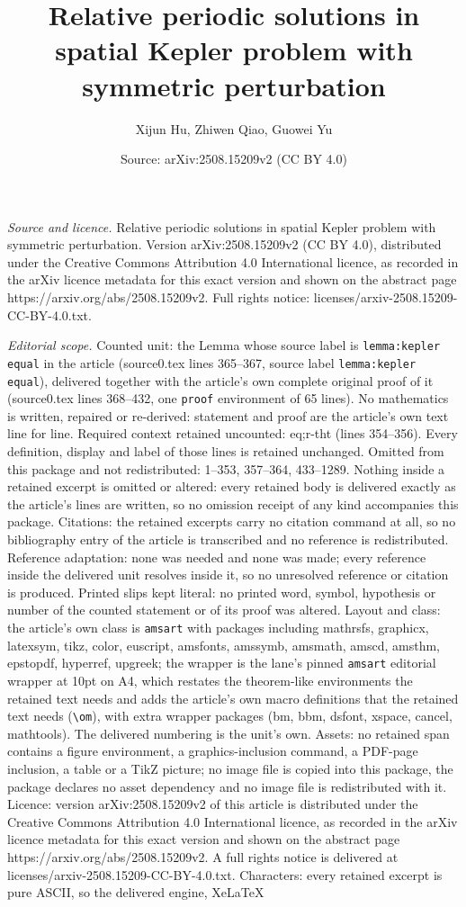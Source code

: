 \documentclass[10pt,a4paper]{amsart}
\title[Relative periodic solutions in spatial Kepler problem with s]{Relative periodic solutions in spatial Kepler problem with symmetric perturbation}
\author{Xijun Hu, Zhiwen Qiao, Guowei Yu}
\date{Source: arXiv:2508.15209v2 (CC BY 4.0)}
\begin{document}
\maketitle

\noindent\emph{Source and licence.} Relative periodic solutions in spatial Kepler problem with symmetric perturbation. Version arXiv:2508.15209v2 (CC BY 4.0), distributed under the Creative Commons Attribution 4.0 International licence, as recorded in the arXiv licence metadata for this exact version and shown on the abstract page https://arxiv.org/abs/2508.15209v2. Full rights notice: licenses/arxiv-2508.15209-CC-BY-4.0.txt.\par\smallskip

\noindent\textit{Editorial scope.} Counted unit: the Lemma whose source label is \texttt{lemma:kepler equal} in the article (source0.tex lines 365--367, source label \texttt{lemma:kepler equal}), delivered together with the article's own complete original proof of it (source0.tex lines 368--432, one \texttt{proof} environment of 65 lines). No mathematics is written, repaired or re-derived: statement and proof are the article's own text line for line. Required context retained uncounted: eq;r-tht (lines 354--356). Every definition, display and label of those lines is retained unchanged. Omitted from this package and not redistributed: 1--353, 357--364, 433--1289. Nothing inside a retained excerpt is omitted or altered: every retained body is delivered exactly as the article's lines are written, so no omission receipt of any kind accompanies this package. Citations: the retained excerpts carry no citation command at all, so no bibliography entry of the article is transcribed and no reference is redistributed. Reference adaptation: none was needed and none was made; every reference inside the delivered unit resolves inside it, so no unresolved reference or citation is produced. Printed slips kept literal: no printed word, symbol, hypothesis or number of the counted statement or of its proof was altered. Layout and class: the article's own class is \texttt{amsart} with packages including mathrsfs, graphicx, latexsym, tikz, color, euscript, amsfonts, amssymb, amsmath, amscd, amsthm, epstopdf, hyperref, upgreek; the wrapper is the lane's pinned \texttt{amsart} editorial wrapper at 10pt on A4, which restates the theorem-like environments the retained text needs and adds the article's own macro definitions that the retained text needs (\texttt{\textbackslash om}), with extra wrapper packages (bm, bbm, dsfont, xspace, cancel, mathtools). The delivered numbering is the unit's own. Assets: no retained span contains a figure environment, a graphics-inclusion command, a PDF-page inclusion, a table or a TikZ picture; no image file is copied into this package, the package declares no asset dependency and no image file is redistributed with it. Licence: version arXiv:2508.15209v2 of this article is distributed under the Creative Commons Attribution 4.0 International licence, as recorded in the arXiv licence metadata for this exact version and shown on the abstract page https://arxiv.org/abs/2508.15209v2. A full rights notice is delivered at licenses/arxiv-2508.15209-CC-BY-4.0.txt. Characters: every retained excerpt is pure ASCII, so the delivered engine, XeLaTeX 
\end{document}
